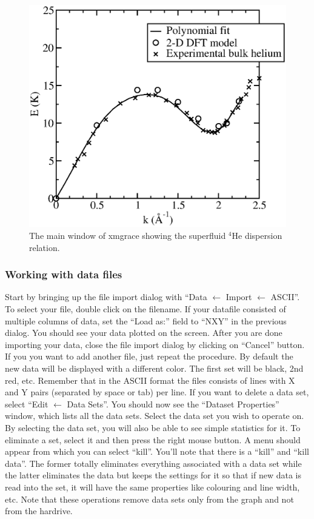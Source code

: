 \documentclass[byrevtex,amssymb,aps,pra,floatfix,letterpaper]{revtex4}
\begin{document}
\vspace*{0.25cm}
\begin{figure}[!htp]
\begin{center}
\includegraphics[scale=0.4]{xmgrace}
\caption{The main window of xmgrace showing the superfluid $^4$He dispersion relation.}
\label{xmgrace}
\end{center}
\end{figure}

\subsubsection{Working with data files}

Start by bringing up the file import dialog with ``Data $\leftarrow$ Import $\leftarrow$ ASCII''. To select your file, double click on the filename. If your datafile consisted of multiple columns of data, set the ``Load as:'' field to ``NXY'' in the previous dialog.
You should see your data plotted on the screen. After you are done importing your data, close the file import dialog by clicking on ``Cancel'' button. If you you want to add another file, just repeat the procedure. By default the new data will be displayed with a different color. The first set will be black, 2nd red, etc. Remember that in the ASCII format the files consists of lines with X and Y pairs (separated by space or tab) per line. If you want to delete a data set, select ``Edit $\leftarrow$ Data Sets''. You should now see the ``Dataset Properties'' window, which lists all the data sets. Select the data set you wish to operate on. By selecting the data set, you will also be able to see simple statistics for it. To eliminate a set, select it and then press the right mouse button. A menu should appear from which you can select ``kill''. You'll note that there is a ``kill'' and ``kill data''. The former totally eliminates everything associated with a data set while the latter eliminates the data but keeps the settings for it so that if new data is read into the set, it will have the same properties like colouring and line width, etc. Note that these operations remove data sets only from the graph and not from the hardrive. 
\end{document}

